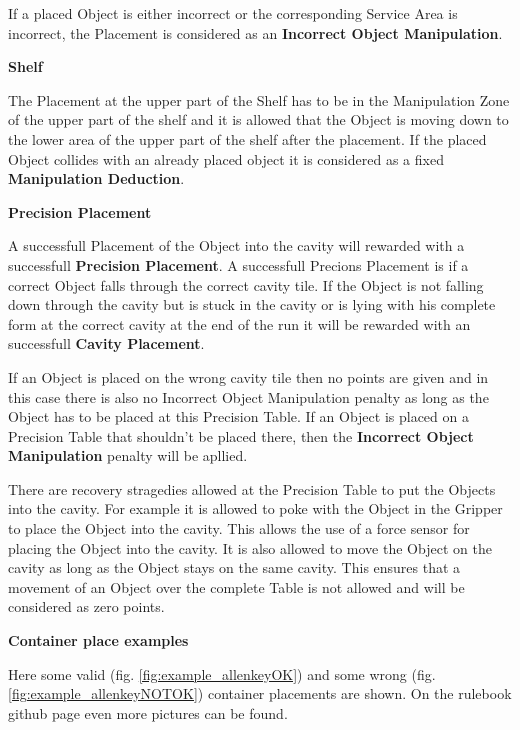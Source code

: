If a placed Object is either incorrect or the corresponding Service Area is incorrect, the Placement is considered as an \textbf{Incorrect Object Manipulation}. 


\textbf{Shelf}

The Placement at the upper part of the Shelf has to be in the Manipulation Zone of the upper part of the shelf and it is allowed that the Object is moving down to the lower area of the upper part of the shelf after the placement. If the placed Object collides with an already placed object it is considered as a fixed \textbf{Manipulation Deduction}.


\textbf{Precision Placement}

A successfull Placement of the Object into the cavity will rewarded with a successfull \textbf{Precision Placement}. A successfull Precions Placement is if a  correct Object falls through the correct cavity tile. If the Object is not falling down through the cavity but is stuck in the cavity or is lying with his complete form at the correct cavity at the end of the run it will be rewarded with an successfull \textbf{Cavity Placement}.

If an Object is placed on the wrong cavity tile then no points are given and in this case there is also no Incorrect Object Manipulation penalty as long as the Object has to be placed at this Precision Table. If an Object is placed on a Precision Table that shouldn't be placed there, then the \textbf{Incorrect Object Manipulation} penalty will be apllied. 

There are recovery stragedies allowed at the Precision Table to put the Objects into the cavity.
For example it is allowed to poke with the Object in the Gripper to place the Object into the cavity. This  allows the use of a force sensor for placing the Object into the cavity.
It is also allowed to move the Object on the cavity as long as the Object stays on the same cavity. This ensures that a movement of an Object over the complete Table is not allowed and will be considered as zero points.

 

\textbf{Container place examples}

Here some valid (fig. \ref{fig:example_allenkeyOK}) and some wrong (fig. \ref{fig:example_allenkeyNOTOK}) container placements are shown. On the rulebook github page even more pictures can be found. 

